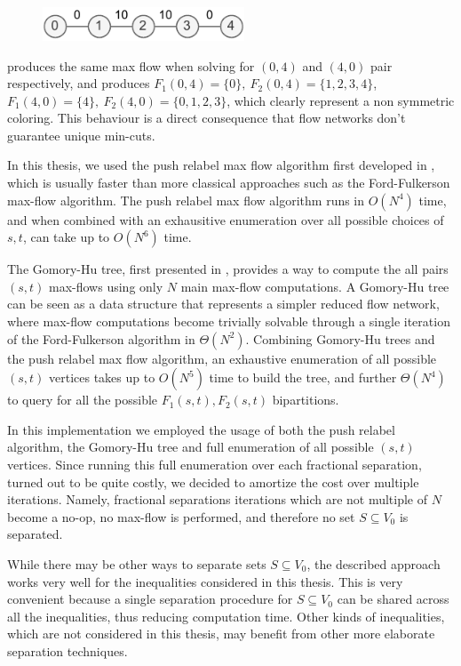 \begin{figure}[H]
	\centering
	\includegraphics[width=6cm]{Imgs/single-path-flow-network.pdf}
\end{figure}

produces the same max flow when solving for $(0, 4)$ and $(4, 0)$ pair respectively, and produces $F_1(0, 4) = \{ 0\},\ F_2(0, 4) = \{ 1, 2, 3, 4\}$, $F_1(4, 0) = \{ 4 \},\ F_2(4, 0) = \{ 0, 1, 2, 3\}$, which clearly represent a non symmetric coloring.
This behaviour is a direct consequence that flow networks don't guarantee unique min-cuts.

In this thesis, we used the push relabel max flow algorithm first developed in \cite{goldberg_efficient_1997}, which is usually faster than more classical approaches such as the Ford-Fulkerson max-flow algorithm.
The push relabel max flow algorithm runs in $O(N^4)$ time, and when combined with an exhausitive enumeration over all possible choices of $s, t$, can take up to $O(N^6)$ time.

The Gomory-Hu tree, first presented in \cite{gomory_multi-terminal_1961}, provides a way to compute the all pairs $(s, t)$ max-flows using only $N$ main max-flow computations.
A Gomory-Hu tree can be seen as a data structure that represents a simpler reduced flow network, where max-flow computations become trivially solvable through a single iteration of the Ford-Fulkerson algorithm in $\Theta(N^2)$.
Combining Gomory-Hu trees and the push relabel max flow algorithm, an exhaustive enumeration of all possible $(s, t)$ vertices takes up to $O(N^5)$ time to build the tree, and further $\Theta(N^4)$ to query for all the possible $F_1(s, t), F_2(s, t)$ bipartitions.

In this implementation we employed the usage of both the push relabel algorithm, the Gomory-Hu tree and full enumeration of all possible $(s, t)$ vertices.
Since running this full enumeration over each fractional separation, turned out to be quite costly, we decided to amortize the cost over multiple iterations.
Namely, fractional separations iterations which are not multiple of $N$ become a no-op, no max-flow is performed, and therefore no set $S \subseteq V_0$ is separated.

While there may be other ways to separate sets $S \subseteq V_0$, the described approach works very well for the inequalities considered in this thesis.
This is very convenient because a single separation procedure for $S \subseteq V_0$ can be shared across all the inequalities, thus reducing computation time.
Other kinds of inequalities, which are not considered in this thesis, may benefit from other more elaborate separation techniques.

